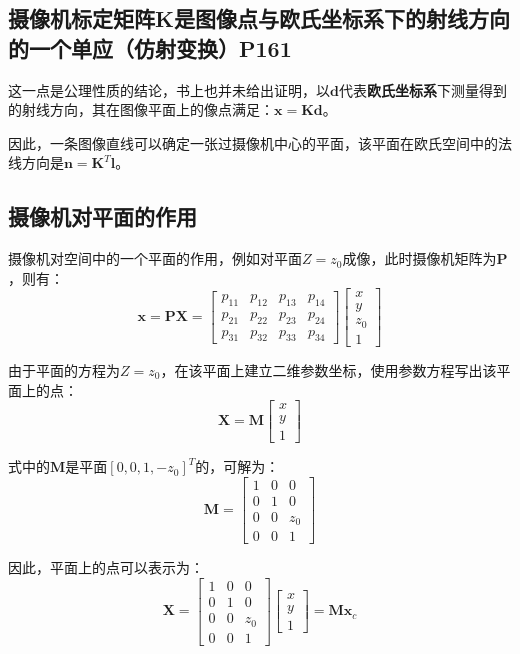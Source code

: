 \documentclass[11pt]{article}
\begin{document}
\subsection{摄像机标定矩阵K是图像点与欧氏坐标系下的射线方向的一个单应（仿射变换）P161}
这一点是公理性质的结论，书上也并未给出证明，以$\mathbold{d}$代表\textbf{欧氏坐标系}下测量得到的射线方向，其在图像平面上的像点满足：$\mathbold{x=Kd}$。\par
因此，一条图像直线可以确定一张过摄像机中心的平面，该平面在欧氏空间中的法线方向是$\mathbold{n=K}^T\mathbold{l}$。
\subsection{摄像机对平面的作用}
摄像机对空间中的一个平面的作用，例如对平面$Z=z_0$成像，此时摄像机矩阵为$\mathbf{P}$，则有：
\begin{equation*}
  \mathbf{x}=\mathbf{P}\mathbf{X}=\begin{bmatrix}
    p_{11}&p_{12}&p_{13}&p_{14}\\
    p_{21}&p_{22}&p_{23}&p_{24}\\
    p_{31}&p_{32}&p_{33}&p_{34}
  \end{bmatrix}\begin{bmatrix}
    x\\y\\z_0\\1
  \end{bmatrix}
\end{equation*}\par
由于平面的方程为$Z=z_0$，在该平面上建立二维参数坐标，使用参数方程写出该平面上的点：
\begin{equation*}
  \mathbf{X}=\mathbf{M}\begin{bmatrix}
    x\\y\\1
  \end{bmatrix}
\end{equation*}\par
式中的$\mathbf{M}$是平面$[0,0,1,-z_0]^T$的，可解为：
\begin{equation*}
  \mathbf{M}=\begin{bmatrix}
    1&0&0\\
    0&1&0\\
    0&0&z_0\\
    0&0&1
  \end{bmatrix}
\end{equation*}\par
因此，平面上的点可以表示为：
\begin{equation*}
  \mathbf{X}=\begin{bmatrix}
    1&0&0\\
    0&1&0\\
    0&0&z_0\\
    0&0&1
  \end{bmatrix}\begin{bmatrix}
    x\\y\\1
  \end{bmatrix}=\mathbf{Mx}_c
\end{equation*}\par
\end{document}
